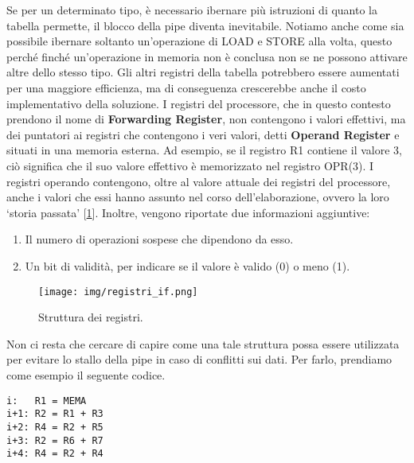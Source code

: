 Se per un determinato tipo, è necessario ibernare più istruzioni di quanto la tabella permette, il blocco della pipe diventa inevitabile. Notiamo anche come sia possibile ibernare soltanto un'operazione di LOAD e STORE alla volta, questo perché  finché un'operazione in memoria non è conclusa non se ne possono attivare altre dello stesso tipo. Gli altri registri della tabella potrebbero essere aumentati per una maggiore efficienza, ma di conseguenza crescerebbe anche il costo implementativo della soluzione. I registri del processore, che in questo contesto prendono il nome di \textbf{Forwarding Register}, non contengono i valori effettivi, ma dei puntatori ai registri che contengono i veri valori, detti \textbf{Operand Register} e situati in una memoria esterna. Ad esempio, se il registro R1 contiene il valore 3, ciò significa che il suo valore effettivo è memorizzato nel registro OPR(3). I registri operando contengono, oltre al valore attuale dei registri del processore, anche i valori che essi hanno assunto nel corso dell'elaborazione, ovvero la loro ‘storia passata’ [\ref{fig:for-op-reg}]. Inoltre, vengono riportate due informazioni aggiuntive:
\begin{enumerate}
    \item Il numero di operazioni sospese che dipendono da esso.
    \item Un bit di validità, per indicare se il valore è valido (0) o meno (1). 
\end{enumerate}
\begin{figure}[!h]
    \centering
    \texttt{[image: img/registri\_if.png]}
    \caption{Struttura dei registri.}
    \label{fig:for-op-reg}
\end{figure}
Non ci resta che cercare di capire come una tale struttura possa essere utilizzata per evitare lo stallo della pipe in caso di conflitti sui dati. Per farlo, prendiamo come esempio il seguente codice.
\begin{lstlisting}
i:   R1 = MEMA
i+1: R2 = R1 + R3
i+2: R4 = R2 + R5
i+3: R2 = R6 + R7
i+4: R4 = R2 + R4
\end{lstlisting}
